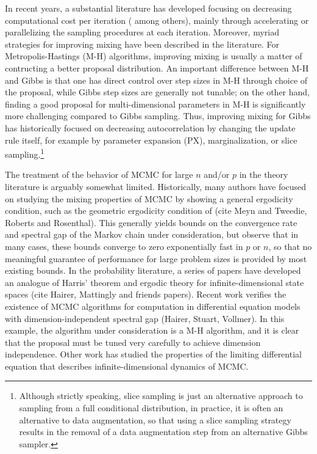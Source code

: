 \documentclass[10pt]{article}
\begin{document}
In recent years, a substantial literature has developed focusing on decreasing computational cost per iteration (\cite{minsker2014robust,srivastava2015wasp,conrad2015accelerating} among others), mainly through accelerating or parallelizing the sampling procedures at each iteration. Moreover, myriad strategies for improving mixing have been described in the literature. For Metropolis-Hastings (M-H) algorithms, improving mixing is usually a matter of contructing a better proposal distribution. An important difference between M-H and Gibbs is that one has direct control over step sizes in M-H through choice of the proposal, while Gibbs step sizes are generally not tunable; on the other hand, finding a good proposal for multi-dimensional parameters in M-H is significantly more challenging compared to Gibbs sampling. Thus, improving mixing for Gibbs has historically focused on decreasing autocorrelation by changing the update rule itself, for example by parameter expansion (PX), marginalization, or slice sampling.\footnote{Although strictly speaking, slice sampling is just an alternative approach to sampling from a full conditional distribution, in practice, it is often an alternative to data augmentation, so that using a slice sampling strategy results in the removal of a data augmentation step from an alternative Gibbs sampler.} 

The treatment of the behavior of MCMC for large $n$ and/or $p$ in the theory literature is arguably somewhat limited. Historically, many authors have focused on studying the mixing properties of MCMC by showing a general ergodicity condition, such as the geometric ergodicity condition of (cite Meyn and Tweedie, Roberts and Rosenthal). This generally yields bounds on the convergence rate and spectral gap of the Markov chain under consideration, but \cite{rajaratnam2015mcmc} observe that in many cases, these bounds converge to zero exponentially fast in $p$ or $n$, so that no meaningful guarantee of performance for large problem sizes is provided by most existing bounds. In the probability literature, a series of papers have developed an analogue of Harris' theorem and ergodic theory for infinite-dimensional state spaces (cite Hairer, Mattingly and friends papers). Recent work verifies the existence of MCMC algorithms for computation in differential equation models with dimension-independent spectral gap (Hairer, Stuart, Vollmer). In this example, the algorithm under consideration is a M-H algorithm, and it is clear that the proposal must be tuned very carefully to achieve dimension independence. Other work has studied the properties of the limiting differential equation that describes infinite-dimensional dynamics of MCMC.
\end{document}

